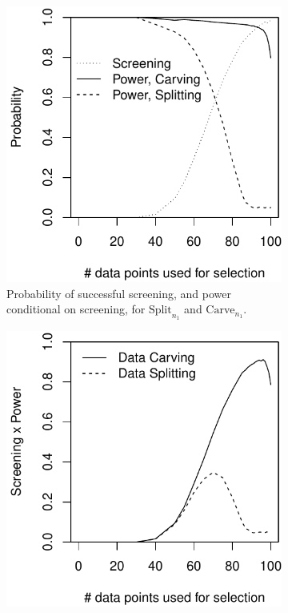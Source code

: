 \documentclass{article}
\theoremstyle{definition}
\begin{document}
\begin{figure}
  \centering
  \begin{subfigure}[t]{.4\textwidth}
    \includegraphics[width=\textwidth]{figs/tradeoff1_will.pdf}
    \caption{Probability of successful screening, and power conditional on screening, for $\text{Split}_{n_1}$ and $\text{Carve}_{n_1}$.}
    \label{fig:lassoTRADE1}
  \end{subfigure}
  \hspace{.1\textwidth}
  \begin{subfigure}[t]{.4\textwidth}
    \includegraphics[width=\textwidth]{figs/tradeoff2_will.pdf}

\end{subfigure}
\end{figure}
\end{document}
